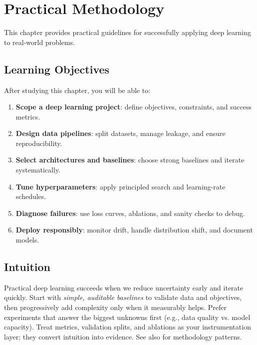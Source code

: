 
\chapter{Practical Methodology}
\label{chap:practical-methodology}

This chapter provides practical guidelines for successfully applying deep learning to real-world problems.


\section*{Learning Objectives}

After studying this chapter, you will be able to:

\begin{enumerate}
    \item \textbf{Scope a deep learning project}: define objectives, constraints, and success metrics.
    \item \textbf{Design data pipelines}: split datasets, manage leakage, and ensure reproducibility.
    \item \textbf{Select architectures and baselines}: choose strong baselines and iterate systematically.
    \item \textbf{Tune hyperparameters}: apply principled search and learning-rate schedules.
    \item \textbf{Diagnose failures}: use loss curves, ablations, and sanity checks to debug.
    \item \textbf{Deploy responsibly}: monitor drift, handle distribution shift, and document models.
\end{enumerate}



\section*{Intuition}

Practical deep learning succeeds when we reduce uncertainty early and iterate quickly. Start with \emph{simple, auditable baselines} to validate data and objectives, then progressively add complexity only when it measurably helps. Prefer experiments that answer the biggest unknowns first (e.g., data quality vs. model capacity). Treat metrics, validation splits, and ablations as your instrumentation layer; they convert intuition into evidence. See also \textcite{GoodfellowEtAl2016} for methodology patterns.












